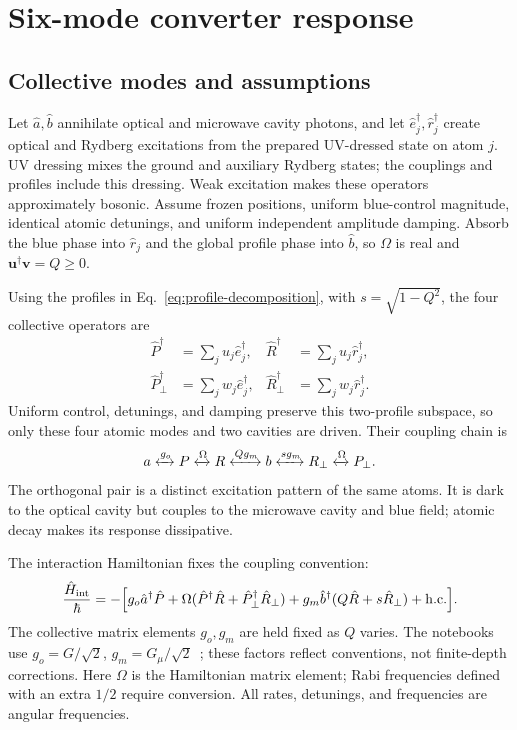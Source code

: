 \documentclass[aps,pra,onecolumn,10pt,letterpaper,notitlepage,nofootinbib,amsmath,amssymb]{revtex4-2}
\newcommand{\Om}{\Omega}
\begin{document}
\section{Six-mode converter response}
\label{sec:model}
\subsection{Collective modes and assumptions}
Let $\hat a,\hat b$ annihilate optical and microwave cavity photons, and let
$\hat e_j^\dagger,\hat r_j^\dagger$ create optical and Rydberg excitations from the
prepared UV-dressed state on atom $j$. UV dressing mixes the ground and auxiliary
Rydberg states; the couplings and profiles include this dressing.
Weak excitation makes these operators approximately bosonic. Assume frozen
positions, uniform blue-control magnitude, identical atomic detunings, and
uniform independent amplitude damping. Absorb the blue phase into $\hat r_j$ and the global
profile phase into $\hat b$, so $\Om$ is real and $\mathbf u^\dagger\mathbf v=Q\geq0$.

Using the profiles in Eq.~\eqref{eq:profile-decomposition}, with
$s=\sqrt{1-Q^2}$, the four collective operators are
\begin{equation}
 \begin{aligned}
 \hat P^\dagger&=\sum_j u_j\hat e_j^\dagger,&
 \hat R^\dagger&=\sum_j u_j\hat r_j^\dagger,\\
 \hat P_\perp^\dagger&=\sum_j w_j\hat e_j^\dagger,&
 \hat R_\perp^\dagger&=\sum_j w_j\hat r_j^\dagger.
 \end{aligned}
 \label{eq:collective-operators}
\end{equation}
Uniform control, detunings, and damping preserve this two-profile subspace, so
only these four atomic modes and two cavities are driven. Their coupling chain is
\begin{equation}
 a\xleftrightarrow{g_o}P\xleftrightarrow{\Om}R
 \xleftrightarrow{Qg_m}b\xleftrightarrow{s g_m}R_\perp
 \xleftrightarrow{\Om}P_\perp.
 \label{eq:coupling-chain}
\end{equation}
The orthogonal pair is a distinct excitation pattern of the same atoms. It is
dark to the optical cavity but couples to the microwave cavity and blue field;
atomic decay makes its response dissipative.

The interaction Hamiltonian fixes the coupling convention:
\begin{equation}
 \frac{\hat H_{\rm int}}{\hbar}
 =-\Bigl[g_o\hat a^\dagger\hat P
 +\Om(\hat P^\dagger\hat R+\hat P_\perp^\dagger\hat R_\perp)
 +g_m\hat b^\dagger(Q\hat R+s\hat R_\perp)+\mathrm{h.c.}\Bigr].
 \label{eq:interaction-hamiltonian}
\end{equation}
The collective matrix elements $g_o,g_m$ are held fixed as $Q$ varies.
The notebooks use $g_o=G/\sqrt2$, $g_m=G_\mu/\sqrt2$~\cite{model}; these factors
reflect conventions, not finite-depth corrections. Here $\Om$ is the
Hamiltonian matrix element; Rabi frequencies defined with an extra $1/2$ require conversion.
All rates, detunings, and frequencies are angular frequencies.
\end{document}

